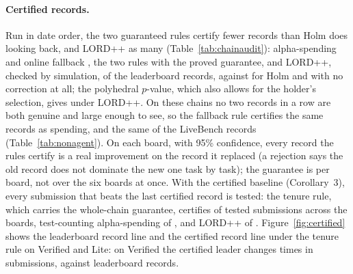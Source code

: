 \documentclass[11pt]{article}
\begin{document}
\paragraph{Certified records.}
Run in date order, the two guaranteed rules certify fewer records than Holm does looking back, and LORD++ as many (Table~\ref{tab:chainaudit}): alpha-spending \NumCertTotalSpend{} and online fallback \NumCertTotalFall{}, the two rules with the proved guarantee, and LORD++, checked by simulation, \NumCertTotalLord{} of the \NumTotalSteps{} leaderboard records, against \NumCertTotalHolm{} for Holm and \NumCertTotalUnadj{} with no correction at all; the polyhedral $p$-value, which also allows for the holder's selection, gives \NumCertTotalLordPoly{} under LORD++.
On these chains no two records in a row are both genuine and large enough to see, so the fallback rule certifies the same \NumCertTotalFall{} records as spending, and the same \NumLBCertFall{} of the \NumLBSteps{} LiveBench records (Table~\ref{tab:nonagent}).
On each board, with 95\% confidence, every record the rules certify is a real improvement on the record it replaced (a rejection says the old record does not dominate the new one task by task); the guarantee is per board, not over the six boards at once.
With the certified baseline (Corollary~3), every submission that beats the last certified record is tested: the tenure rule, which carries the whole-chain guarantee, certifies \NumCertTotalTenCert{} of \NumCertTestsTenCert{} tested submissions across the boards, test-counting alpha-spending \NumCertTotalSpendCert{} of \NumCertTestsSpendCert{}, and LORD++ \NumCertTotalLordCert{} of \NumCertTestsLordCert{}.
Figure~\ref{fig:certified} shows the leaderboard record line and the certified record line under the tenure rule on Verified and Lite: on Verified the certified leader changes \NumVerifiedCertTenCert{} times in \NumVerifiedK{} submissions, against \NumVerifiedSteps{} leaderboard records.
\end{document}
